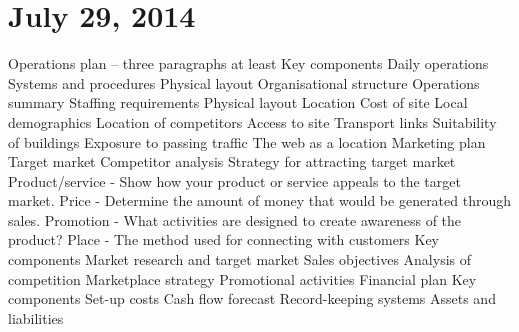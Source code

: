 \section{July 29, 2014}
\begin{outline}
\1 Operations plan -- three paragraphs at least
\2 Key components
\3 Daily operations
\3 Systems and procedures
\3 Physical layout
\3 Organisational structure
\3 Operations summary
\4 Staffing requirements
\4 Physical layout
\4 Location
\4 Cost of site
\4 Local demographics
\4 Location of competitors
\4 Access to site
\4 Transport links
\4 Suitability of buildings
\4 Exposure to passing traffic
\4 The web as a location
\1 Marketing plan
\2 Target market
\2 Competitor analysis
\2 Strategy for attracting target market
\3 Product/service - Show how your product or service appeals to the target market.
\3 Price - Determine the amount of money that would be generated through sales.
\3 Promotion - What activities are designed to create awareness of the product?
\3 Place - The method used for connecting with customers
\2 Key components
\3 Market research and target market
\3 Sales objectives
\3 Analysis of competition
\3 Marketplace strategy
\3 Promotional activities
\1 Financial plan
\2 Key components
\3 Set-up costs
\3 Cash flow forecast
\3 Record-keeping systems
\3 Assets and liabilities
\end{outline}

